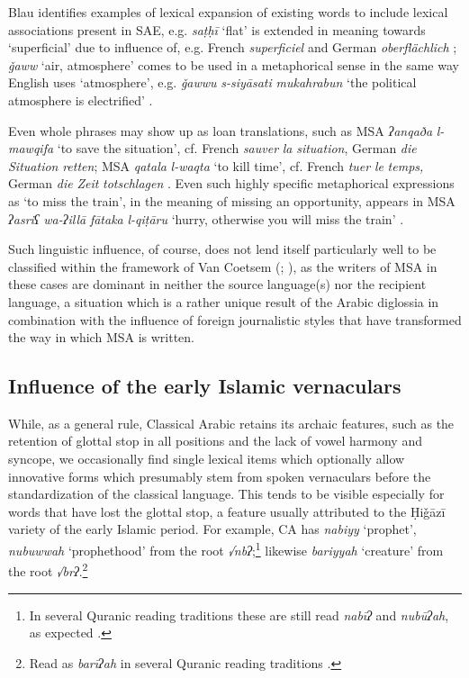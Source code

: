 \documentclass[output=paper]{langsci/langscibook}
\begin{document}
Blau identifies examples of lexical expansion of existing words to include lexical associations present in SAE, e.g. \textit{saṭḥī} ‘flat’ is extended in meaning towards ‘superficial’ due to influence of, e.g.  French \textit{superficiel} and German \textit{oberflächlich} \citep[65]{Blau1969}; \textit{ǧaww} ‘air, atmosphere’ comes to be used in a metaphorical sense in the same way English uses ‘atmosphere’, e.g. \textit{ǧawwu} \textit{s-siyāsati} \textit{mukahrabun} ‘the political atmosphere is electrified’ \citep[69]{Blau1969}.

Even whole phrases may show up as loan translations, such as MSA \textit{ʔanqaða} \textit{l-mawqifa} ‘to save the situation’, cf. French \textit{sauver} \textit{la} \textit{situation}, German \textit{die} \textit{Situation} \textit{retten}; MSA \textit{qatala} \textit{l-waqta} ‘to kill time’, cf. French \textit{tuer} \textit{le} \textit{temps,} German \textit{die} \textit{Zeit} \textit{totschlagen} \citep[76]{Blau1969}. Even such highly specific metaphorical expressions as ‘to miss the train’, in the meaning of missing an opportunity, appears in MSA \textit{ʔasriʕ} \textit{wa-ʔillā} \textit{fātaka} \textit{l-qiṭāru} ‘hurry, otherwise you will miss the train’ \citep[101]{Blau1969}.

Such linguistic influence, of course, does not lend itself particularly well to be classified within the framework of Van Coetsem (\citeyear{VanCoetsem1988}; \citeyear{VanCoetsem2000}), as the writers of MSA in these cases are dominant in neither the source language(s) nor the recipient language, a situation which is a rather unique result of the Arabic diglossia in combination with the influence of foreign journalistic styles that have transformed the way in which MSA is written.

\subsection{\label{bkm:Ref13224870}Influence of the early Islamic vernaculars}

While, as a general rule, Classical Arabic retains its archaic features, such as the retention of glottal stop in all positions and the lack of vowel harmony and syncope, we occasionally find single lexical items which optionally allow innovative forms which presumably stem from spoken vernaculars before the standardization of the classical language. This tends to be visible especially for words that have lost the glottal stop, a feature usually attributed to the Ḥiǧāzī variety of the early Islamic period. For example, CA has \textit{nabiyy} ‘prophet’, \textit{nubuwwah} ‘prophethood’ from the root \textit{√nbʔ};\footnote{In several Quranic reading traditions these are still read \textit{nabīʔ} and \textit{nubūʔah}, as expected \citep[106--107]{IbnMujahid}.} likewise \textit{bariyyah} ‘creature’ from the root \textit{√brʔ}.\footnote{Read as \textit{barīʔah} in several Quranic reading traditions \citep[693]{IbnMujahid}.}
\end{document}
